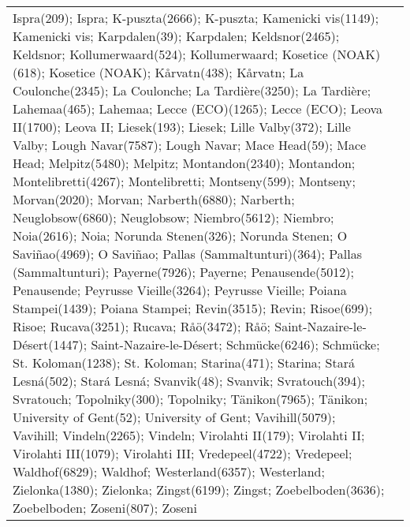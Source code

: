 \documentclass[journal abbreviation, manuscript]{copernicus}
\begin{document}
\begin{table}
\begin{tabularx}{\textwidth}{lX}
Ispra(209); Ispra; K-puszta(2666); K-puszta; Kamenicki vis(1149); Kamenicki vis; Karpdalen(39); Karpdalen; Keldsnor(2465); Keldsnor; Kollumerwaard(524); Kollumerwaard; Kosetice (NOAK)(618); Kosetice (NOAK); Kårvatn(438); Kårvatn; La Coulonche(2345); La Coulonche; La Tardière(3250); La Tardière; Lahemaa(465); Lahemaa; Lecce (ECO)(1265); Lecce (ECO); Leova II(1700); Leova II; Liesek(193); Liesek; Lille Valby(372); Lille Valby; Lough Navar(7587); Lough Navar; Mace Head(59); Mace Head; Melpitz(5480); Melpitz; Montandon(2340); Montandon; Montelibretti(4267); Montelibretti; Montseny(599); Montseny; Morvan(2020); Morvan; Narberth(6880); Narberth; Neuglobsow(6860); Neuglobsow; Niembro(5612); Niembro; Noia(2616); Noia; Norunda Stenen(326); Norunda Stenen; O Saviñao(4969); O Saviñao; Pallas (Sammaltunturi)(364); Pallas (Sammaltunturi); Payerne(7926); Payerne; Penausende(5012); Penausende; Peyrusse Vieille(3264); Peyrusse Vieille; Poiana Stampei(1439); Poiana Stampei; Revin(3515); Revin; Risoe(699); Risoe; Rucava(3251); Rucava; Råö(3472); Råö; Saint-Nazaire-le-Désert(1447); Saint-Nazaire-le-Désert; Schmücke(6246); Schmücke; St. Koloman(1238); St. Koloman; Starina(471); Starina; Stará Lesná(502); Stará Lesná; Svanvik(48); Svanvik; Svratouch(394); Svratouch; Topolniky(300); Topolniky; Tänikon(7965); Tänikon; University of Gent(52); University of Gent; Vavihill(5079); Vavihill; Vindeln(2265); Vindeln; Virolahti II(179); Virolahti II; Virolahti III(1079); Virolahti III; Vredepeel(4722); Vredepeel; Waldhof(6829); Waldhof; Westerland(6357); Westerland; Zielonka(1380); Zielonka; Zingst(6199); Zingst; Zoebelboden(3636); Zoebelboden; Zoseni(807); Zoseni \\

\end{tabularx}
\end{table}
\end{document}
